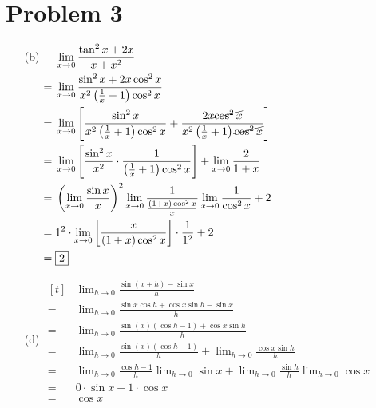 \documentclass{article}
\newcommand*{\paren}[1]{\ensuremath\left(#1\right)}
\newcommand*{\problem}[1]{\section*{Problem #1}}
\newcommand*{\limit}[2][x]{\ensuremath{\displaystyle\lim_{#1\to#2}}}
\newcommand*{\Limit}[3][x]{\ensuremath{\displaystyle\lim_{#1\to#2}\left[#3\right]}}
\begin{document}
\problem{3}
\begin{multicols}{2}
\begin{itemize}
	\item[(b)]
	$\begin{aligned}[t]
		&\limit{0}\frac{\tan^2x+2x}{x+x^2} \\
		={}&\limit{0}\frac{\sin^2x+2x\cos^2x}{x^2\paren{\frac{1}{x}+1}\cos^2x} \\
		={}&\Limit{0}{\frac{\sin^2x}{x^2\paren{\frac{1}{x}+1}\cos^2x}+\frac{2x\cancel{\cos^2x}}{x^2\paren{\frac{1}{x}+1}\cancel{\cos^2x}}} \\
		={}&\Limit{0}{\frac{\sin^2x}{x^2}\cdot\frac{1}{\paren{\frac{1}{x}+1}\cos^2x}}+\limit{0}\frac{2}{1+x} \\
		={}&\paren{\limit{0}\frac{\sin x}{x}}^2\limit{0}\frac{1}{\frac{(1+x)\cos^2x}{x}}\limit{0}\frac{1}{\cos^2x}+2 \\
		={}&1^2\cdot\Limit{0}{\frac{x}{(1+x)\cos^2x}}\cdot\frac{1}{1^2}+2 \\
		={}&\boxed{2}
	\end{aligned}$

	\item[(d)]
	$\begin{aligned}[t]
		&\limit[h]{0}\frac{\sin(x+h)-\sin x}{h} \\
		={}&\limit[h]{0}\frac{\sin x\cos h+\cos x\sin h-\sin x}{h} \\
		={}&\limit[h]{0}\frac{\sin(x)(\cos h-1)+\cos x\sin h}{h} \\
		={}&\limit[h]{0}\frac{\sin(x)(\cos h-1)}{h}+\limit[h]{0}\frac{\cos x\sin h}{h} \\
		={}&\limit[h]{0}\frac{\cos h - 1}{h}\limit[h]{0}\sin x+\limit[h]{0}\frac{\sin h}{h}\limit[h]{0}\cos x \\
		={}&0\cdot\sin x+1\cdot\cos x \\
		={}&\boxed{\cos x}
	\end{aligned}$
\end{itemize}
\end{multicols}
\end{document}

